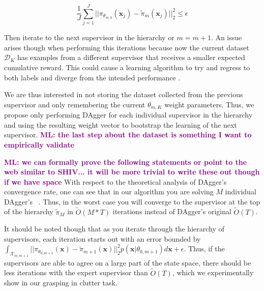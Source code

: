 \documentclass[10pt, conference]{ieeeconf}      %
\newcommand{\mlnote}[1]{\ifthenelse{ \boolean{include-notes}}%
 {\textcolor{purple}{\textbf{ML: #1}}}{}}
\begin{document}
$$\frac{1}{J} \sum^J_{j=1} ||\pi_{\theta_{m,k}}(\mathbf{x}_j) - \tilde{\pi}_m(\mathbf{x}_j) ||^2_2 \leq \epsilon$$

Then iterate to the next supervisor in the hierarchy or $m = m+1$. An issue arises though when performing this iterations because now the current dataset $\mathcal{D}_K$ has examples from a different supervisor that receives a smaller expected cumulative reward. This could cause a learning algorithm to try and regress to both labels and diverge from the intended performance \cite{scholkopf2002learning}.

We are thus interested in not storing the dataset collected from the previous supervisor and only remembering the current $\theta_{m,K}$ weight parameters. Thus, we propose only performing DAgger for each individual supervisor in the hierarchy and using the resulting weight vector to bootstrap the learning of the next supervisor. \mlnote{the last step about the dataset is something I want to empirically validate}

\mlnote{we can formally prove the following statements or point to the web similar to SHIV... it will be more trivial to write these out though if we have space}
With respect to the theoretical analysis of DAgger's convergence rate, one can see that in our algorithm you are solving $M$ individual DAgger's ~\cite{ross2010reduction}. Thus, in the worst case you will converge to the supervisor at the top of the hierarchy $\tilde{\pi}_M$ in $\tilde{O}(M*T)$ iterations instead of DAgger's original $\tilde{O}(T)$. 

It should be noted though that as you iterate through the hierarchy of supervisors, each iteration starts out with an error bounded by $\int_{\mathcal{X}_{m,m+1}} ||\pi_{\theta_{0,m+1}}(\mathbf{x}) - \tilde{\pi}_{m+1}(\mathbf{x})||^2_2 p(\mathbf{x}|\theta_{0,m+1}) d\mathbf{x} + \epsilon$. Thus, if the supervisors are able to agree on a large part of the state space, there should be less iterations with the expert supervisor than $\tilde{O}(T)$, which we experimentally show in our grasping in clutter task. 
 
\end{document}
